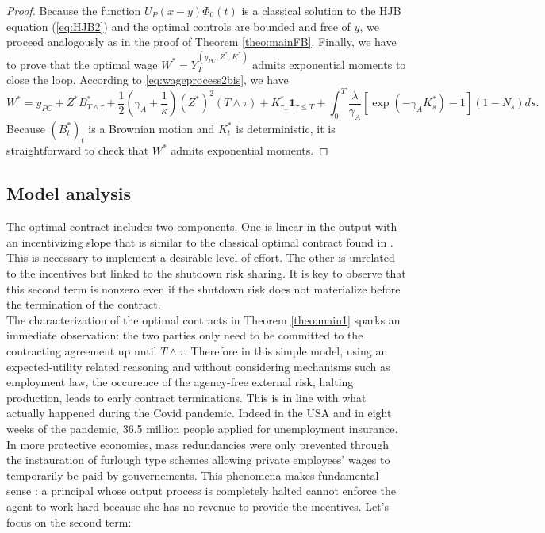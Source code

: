 \documentclass[numbook, envcountsect, envcountsame, envcountreset, runningheads, smallextended]{article}
\begin{document}
\begin{proof}
Because the function $U_P(x-y) \Phi_0(t)$ is a classical solution to the HJB equation (\ref{eq:HJB2}) and the optimal controls are bounded and free of $y$, we proceed analogously as in the proof of Theorem \ref{theo:mainFB}.
Finally, we have to prove that the optimal wage $W^*=Y_T^{(y_{PC},Z^*,K^*)}$ admits exponential moments to close the loop. According to \eqref{eq:wageprocess2bis}, we have
$$
W^*=y_{PC}+Z^*B^*_{T\wedge \tau}+\frac{1}{2}\left(\gamma_A+\frac{1}{\kappa}\right)(Z^*)^2 (T\wedge \tau )+K^*_{\tau_{-}} \textbf{1}_{\tau \leq T}  + \int_0^T  \frac{\lambda}{\gamma_A} [\exp(-\gamma_A K^*_s) - 1 ](1-N_s) ds. 
$$
Because $(B^*_t)_t$ is a Brownian motion and $K^*_t$ is deterministic, it is straightforward to check that $W^*$ admits exponential moments.
\end{proof}








\subsection{Model analysis}












The optimal contract includes two components. One is  linear in the output with an incentivizing slope  that is similar to the classical optimal contract found in \cite{HM}. This is necessary to implement a desirable level of effort. The other  is unrelated to the incentives but linked to the shutdown risk sharing. It is key to observe that this second term is nonzero even if the shutdown risk does not materialize before the termination of the contract. \\
The characterization of the optimal contracts in Theorem \ref{theo:main1} sparks an immediate observation:  the two parties only need to be committed to the contracting agreement up until $T \wedge \tau$.  Therefore in this simple model, using an expected-utility related reasoning and without considering mechanisms such as employment law, the occurence of the agency-free external risk, halting production, leads to early contract terminations. This is in line with what actually happened during the Covid pandemic. Indeed in the USA and in eight weeks of the pandemic, 36.5 million people applied for unemployment insurance. In more protective economies, mass redundancies were only prevented through the instauration of furlough type schemes allowing private employees' wages to temporarily be paid by gouvernements. This phenomena makes fundamental sense : a principal whose output process is completely halted cannot enforce the agent to work hard because she has no revenue to provide the incentives. Let's focus on the second term:   
\end{document}
